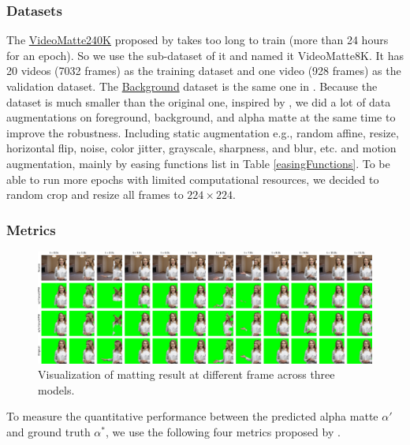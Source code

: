 \documentclass[final]{cvpr}
\begin{document}
\subsubsection{Datasets}

The \href{https://grail.cs.washington.edu/projects/background-matting-v2/#/datasets}{VideoMatte240K} proposed by \cite{linRealTimeHighResolutionBackground2020a} takes too long to train (more than 24 hours for an epoch).
So we use the sub-dataset of it and named it VideoMatte8K.
It has 20 videos (7032 frames) as the training dataset and one video (928 frames) as the validation dataset.
The \href{https://grail.cs.washington.edu/projects/background-matting-v2/#/datasets}{Background} dataset is the same one in \cite{linRealTimeHighResolutionBackground2020a}. Because the dataset is much smaller than the original one, inspired by \cite{linRobustHighResolutionVideo2021}, we did a lot of data augmentations on foreground, background, and alpha matte at the same time to improve the robustness.
Including static augmentation e.g., random affine, resize, horizontal flip, noise, color jitter, grayscale, sharpness, and blur, etc. and motion augmentation, mainly by easing functions list in Table \ref{easingFunctions}.
To be able to run more epochs with limited computational resources, we decided to random crop and resize all frames to $224 \times 224$.

\subsubsection{Metrics}

\begin{figure}[t]
    \begin{center}
        \includegraphics[width=1\textwidth]{img/visual.pdf}
    \end{center}
    \caption{Visualization of matting result at different frame across three models.}
    \label{visual}
\end{figure}

To measure the quantitative performance between the predicted alpha matte $\alpha'$ and ground truth $\alpha^*$, we use the following four metrics proposed by \cite{Rhemann2009APM}.
\end{document}
